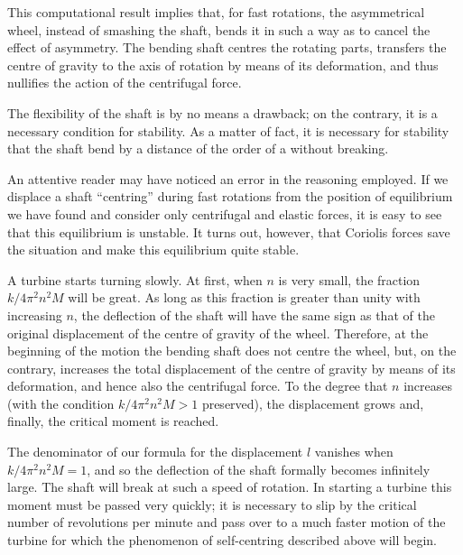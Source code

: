 This computational result implies that, for fast rotations, the asymmetrical wheel, instead of smashing the
shaft, bends it in such a way as to cancel the effect of
asymmetry. The bending shaft centres the rotating parts,
transfers the centre of gravity to the axis of rotation by
means of its deformation, and thus nullifies the action of
the centrifugal force.

The flexibility of the shaft is by no means a drawback;
on the contrary, it is a necessary condition for stability.
As a matter of fact, it is necessary for stability that the
shaft bend by a distance of the order of a without breaking.

An attentive reader may have noticed an error in the
reasoning employed. If we displace a shaft ``centring''
during fast rotations from the position of equilibrium we
have found and consider only centrifugal and elastic
forces, it is easy to see that this equilibrium is unstable.
It turns out, however, that Coriolis forces save the situation and make this equilibrium quite stable.

A turbine starts turning slowly. At first, when $n$ is very small, the fraction $k/4\pi^{2}n^{2}M$ will be great. As long as this fraction is greater than unity with increasing $n$, the deflection of the shaft will have the same sign as that of the original displacement of the centre of gravity of the wheel. Therefore, at the beginning of the motion the bending shaft does not centre the wheel, but, on the contrary, increases the total displacement of the centre of gravity by means of its deformation, and hence also the centrifugal force. To the degree that $n$ increases (with the condition $k/4\pi^{2}n^{2}M > 1$ preserved), the displacement grows and, finally, the critical moment is reached. 

The denominator of our formula for the displacement $l$ vanishes when $k/4\pi^{2}n^{2}M = 1$, and so the deflection of the shaft formally becomes infinitely large. The shaft will break at such a speed of rotation. In starting a turbine this moment must be passed very quickly; it is necessary to slip by the critical number of revolutions per minute and pass over to a much faster motion of the turbine for which the phenomenon of self-centring described above will begin.

